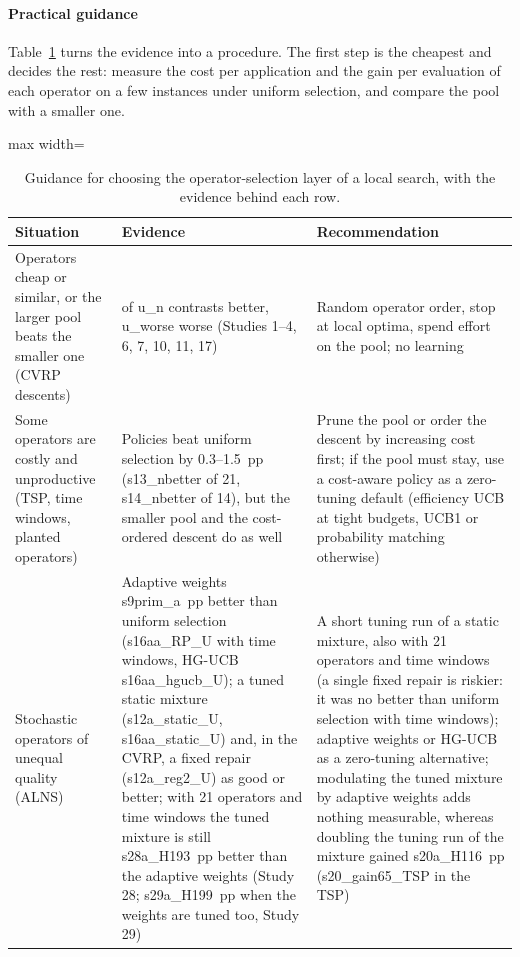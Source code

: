 \paragraph{Practical guidance}
Table~\ref{tab:guia} turns the evidence into a procedure. The first step is the cheapest and decides the rest: measure the cost per application and the gain per evaluation of each operator on a few instances under uniform selection, and compare the pool with a smaller one.

\begin{table}[t]
\caption{Guidance for choosing the operator-selection layer of a local search, with the evidence behind each row.}\label{tab:guia}
\centering\small
\begin{adjustbox}{max width=\linewidth}
\begin{tabular}{>{\raggedright\arraybackslash}p{4.2cm}>{\raggedright\arraybackslash}p{5.2cm}>{\raggedright\arraybackslash}p{5.9cm}}
\toprule
Situation & Evidence & Recommendation \\
\midrule
Operators cheap or similar, or the larger pool beats the smaller one (CVRP descents) & 0 of \num{u_n} contrasts better, \num{u_worse} worse (Studies 1--4, 6, 7, 10, 11, 17) & Random operator order, stop at local optima, spend effort on the pool; no learning \\
Some operators are costly and unproductive (TSP, time windows, planted operators) & Policies beat uniform selection by 0.3--1.5~pp (\num{s13_nbetter} of 21, \num{s14_nbetter} of 14), but the smaller pool and the cost-ordered descent do as well & Prune the pool or order the descent by increasing cost first; if the pool must stay, use a cost-aware policy as a zero-tuning default (efficiency UCB at tight budgets, UCB1 or probability matching otherwise) \\
Stochastic operators of unequal quality (ALNS) & Adaptive weights \num{s9prim_a}~pp better than uniform selection (\num{s16aa_RP_U} with time windows, HG-UCB \num{s16aa_hgucb_U}); a tuned static mixture (\num{s12a_static_U}, \num{s16aa_static_U}) and, in the CVRP, a fixed repair (\num{s12a_reg2_U}) as good or better; with 21 operators and time windows the tuned mixture is still \num{s28a_H193}~pp better than the adaptive weights (Study 28; \num{s29a_H199}~pp when the weights are tuned too, Study 29) & A short tuning run of a static mixture, also with 21 operators and time windows (a single fixed repair is riskier: it was no better than uniform selection with time windows); adaptive weights or HG-UCB as a zero-tuning alternative; modulating the tuned mixture by adaptive weights adds nothing measurable, whereas doubling the tuning run of the mixture gained \num{s20a_H116}~pp (\num{s20_gain65_TSP} in the TSP) \\

\end{tabular}
\end{adjustbox}
\end{table}
